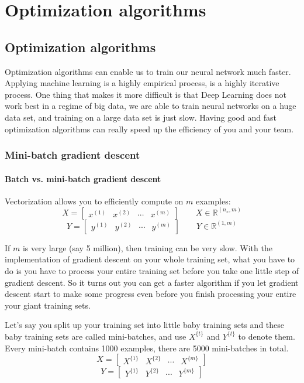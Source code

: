 \documentclass[UTF8]{article}
\newcommand{\Vector}[1]{\boldsymbol{\mathit{#1}}}   %
\newcommand{\Matrix}[1]{\boldsymbol{\mathit{#1}}}   %
\newcommand{\Set}[1]{\mathbb{#1}}                   %
\begin{document}
\section{Optimization algorithms}

\subsection{Optimization algorithms}
Optimization algorithms can enable us to train our neural network much faster. Applying machine
learning is a highly empirical process, is a highly iterative process. One thing that makes it
more difficult is that Deep Learning does not work best in a regime of big data, we are able to
train neural networks on a huge data set, and training on a large data set is just slow. Having
good and fast optimization algorithms can really speed up the efficiency of you and your team.

\subsubsection{Mini-batch gradient descent}
\paragraph{Batch vs. mini-batch gradient descent}
Vectorization allows you to efficiently compute on $m$ examples:
$$ \Matrix{X} = \left[\begin{array}{cccc} \Vector{x^{(1)}} & \Vector{x^{(2)}} & \cdots
& \Vector{x^{(m)}}\end{array}\right] \qquad \Matrix{X} \in \Set{R}^{(n_x, m)} $$
$$ \Matrix{Y} = \left[\begin{array}{cccc} \Vector{y^{(1)}} & \Vector{y^{(2)}} & \cdots
& \Vector{y^{(m)}}\end{array}\right] \qquad \Matrix{Y} \in \Set{R}^{(1, m)} $$

If $m$ is very large (say 5 million), then training can be very slow. With the implementation of
gradient descent on your whole training set, what you have to do is you have to process your entire
training set before you take one little step of gradient descent. So it turns out you can get a
faster algorithm if you let gradient descent start to make some progress even before you finish
processing your entire your giant training sets.

Let's say you split up your training set into little baby training sets and these baby training
sets are called mini-batches, and use $\Matrix{X^{\{t\}}}$ and $\Matrix{Y^{\{t\}}}$ to denote them.
Every mini-batch contains 1000 examples, there are 5000 mini-batches in total.
$$ \Matrix{X} = \left[\begin{array}{cccc} \Matrix{X^{\{1\}}} & \Matrix{X^{\{2\}}} & \cdots
& \Matrix{X^{\{m\}}} \end{array}\right] $$
$$ \Matrix{Y} = \left[\begin{array}{cccc} \Matrix{Y^{\{1\}}} & \Matrix{Y^{\{2\}}} & \cdots
& \Matrix{Y^{\{m\}}} \end{array}\right] $$
\end{document}
